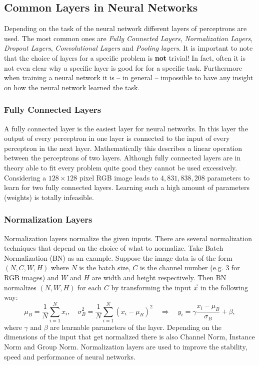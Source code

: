 \subsection{Common Layers in Neural Networks} \label{sec:2.1.3}
Depending on the task of the neural network different layers of perceptrons are used. The most common ones are \textit{Fully Connected Layers}, \textit{Normalization Layers}, \textit{Dropout Layers}, \textit{Convolutional Layers} and \textit{Pooling layers}. It is important to note that the choice of layers for a specific problem is \textbf{not} trivial! In fact, often it is not even clear why a specific layer is good for for a specific task. Furthermore when training a neural network it is – in general – impossible to have any insight on how the neural network learned the task.
%
\subsubsection{Fully Connected Layers}
A fully connected layer is the easiest layer for neural networks. In this layer the output of every perceptron in one layer is connected to the input of every perceptron in the next layer. Mathematically this describes a linear operation between the perceptrons of two layers. Although fully connected layers are in theory able to fit every problem quite good they cannot be used excessively. Considering a $128\times128$ pixel RGB image leads to $4,831,838,208$ parameters to learn for two fully connected layers. Learning such a high amount of parameters (weights) is totally infeasible.
%
\subsubsection{Normalization Layers}
Normalization layers normalize the given inputs. There are several normalization techniques that depend on the choice of what to normalize. Take Batch Normalization (BN) as an example. Suppose the image data is of the form $(N, C, W, H)$ where $N$ is the batch size, $C$ is the channel number (e.g. $3$ for RGB images) and $W$ and $H$ are width and height respectively. Then BN normalizes $(N, W, H)$ for each $C$ by transforming the input $\vec{x}$ in the following way:
%
\begin{equation}
    \mu_B=\frac{1}{N}\sum_{i=1}^Nx_i, \quad\sigma_B^2=\frac{1}{N}\sum_{i=1}^N(x_i-\mu_B)^2\quad \Longrightarrow\quad y_i=\gamma\frac{x_i-\mu_B}{\sigma_B}+\beta,
\end{equation}
%
where $\gamma$ and $\beta$ are learnable parameters of the layer. Depending on the dimensions of the input that get normalized there is also Channel Norm, Instance Norm and Group Norm. Normalization layers are used to improve the stability, speed and performance of neural networks.
%
